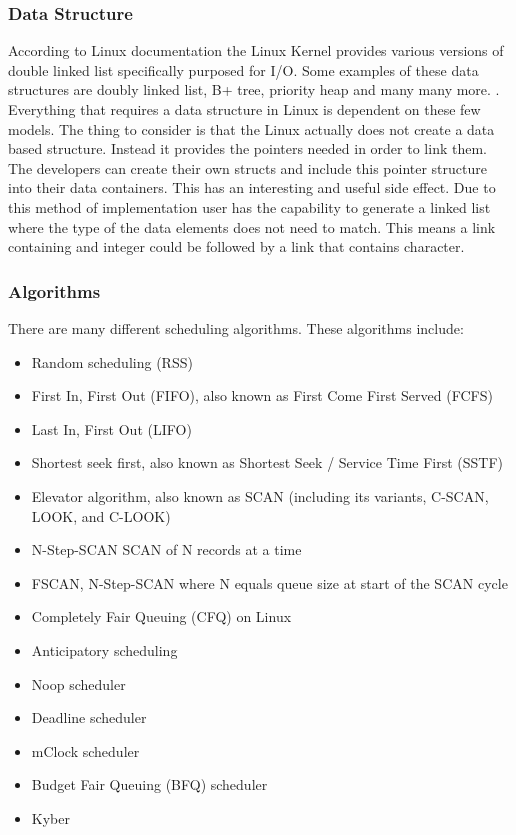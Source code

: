 \documentclass[journal,10pt,onecolumn,compsoc,letterpaper,draftclsnofoot,table,xcdraw]{IEEEtran} \usepackage[margin=0.75in]{geometry}
\begin{document}
\subsubsection{Data Structure}
\noindent According to Linux documentation the Linux Kernel provides various versions of double linked list specifically purposed for I/O. Some examples of these data structures are doubly linked list, B+ tree, priority heap and many many more. \cite{1}. Everything that requires a data structure in Linux is dependent on these few models. The thing to consider is that the Linux actually does not create a data based structure. Instead it provides the pointers needed in order to link them. The developers can create their own structs and include this pointer structure into their data containers. This has an interesting and useful side effect. Due to this method of implementation user has the capability to generate a linked list where the type of the data elements does not need to match. This means a link containing and integer could be followed by a link that contains character.
\subsubsection{Algorithms}
\noindent There are many different scheduling algorithms. These algorithms include: 
\begin{itemize}
\item Random scheduling (RSS)
\item First In, First Out (FIFO), also known as First Come First Served (FCFS)
\item Last In, First Out (LIFO)
\item Shortest seek first, also known as Shortest Seek / Service Time First (SSTF)
\item Elevator algorithm, also known as SCAN (including its variants, C-SCAN, LOOK, and C-LOOK)
\item N-Step-SCAN SCAN of N records at a time
\item FSCAN, N-Step-SCAN where N equals queue size at start of the SCAN cycle
\item Completely Fair Queuing (CFQ) on Linux
\item Anticipatory scheduling
\item Noop scheduler
\item Deadline scheduler
\item mClock scheduler \cite{2}
\item Budget Fair Queuing (BFQ) scheduler \cite{3}
\item Kyber \cite{4}
\end{itemize}
\end{document}
